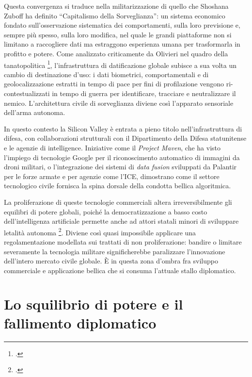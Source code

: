\documentclass[a4paper,12pt]{report}
\begin{document}
Questa convergenza si traduce nella militarizzazione di quello che Shoshana
Zuboff ha definito ``Capitalismo della Sorveglianza'': un sistema economico
fondato sull'osservazione sistematica dei comportamenti, sulla loro previsione
e, sempre più spesso, sulla loro modifica, nel quale le grandi piattaforme non
si limitano a raccogliere dati ma estraggono esperienza umana per trasformarla
in profitto e potere. Come analizzato criticamente da Olivieri nel quadro della
tanatopolitica \footcite{oliveri_2024}, l'infrastruttura di datificazione
globale subisce a sua volta un cambio di destinazione d'uso: i dati biometrici,
comportamentali e di geolocalizzazione estratti in tempo di pace per fini di
profilazione vengono ri-contestualizzati in tempo di guerra per identificare,
tracciare e neutralizzare il nemico. L'architettura civile di sorveglianza
diviene così l'apparato sensoriale dell'arma autonoma.
 
In questo contesto la Silicon Valley è entrata a pieno titolo
nell'infrastruttura di difesa, con collaborazioni strutturali con il
Dipartimento della Difesa statunitense e le agenzie di intelligence. Iniziative
come il \textit{Project Maven}, che ha visto l'impiego di tecnologie Google per
il riconoscimento automatico di immagini da droni militari, o l'integrazione dei
sistemi di \textit{data fusion} sviluppati da Palantir per le forze armate e per
agenzie come l'ICE, dimostrano come il settore tecnologico civile fornisca la
spina dorsale della condotta bellica algoritmica.
 
La proliferazione di queste tecnologie commerciali altera irreversibilmente gli
equilibri di potere globali, poiché la democratizzazione a basso costo
dell'intelligenza artificiale permette anche ad attori statali minori di
sviluppare letalità autonoma \footcite{longpre_2022}. Diviene così quasi
impossibile applicare una regolamentazione modellata sui trattati di non
proliferazione: bandire o limitare severamente la tecnologia militare
significherebbe paralizzare l'innovazione dell'intero mercato civile globale. È
in questa zona d'ombra fra sviluppo commerciale e applicazione bellica che si
consuma l'attuale stallo diplomatico.
 
\section{Lo squilibrio di potere e il fallimento diplomatico}
 
\end{document}
